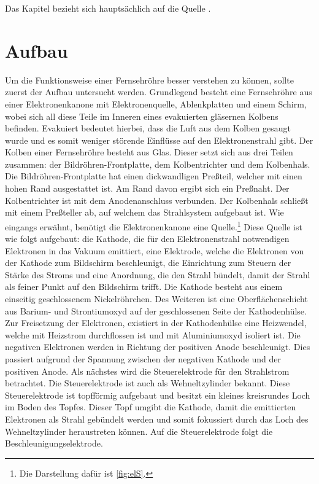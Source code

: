 Das Kapitel bezieht sich hauptsächlich auf die Quelle \cite{Fernsehroehre}.
\section{Aufbau}
\label{sec:aufbau}
Um die Funktionsweise einer Fernsehröhre besser verstehen zu können, sollte zuerst der Aufbau untersucht werden.
Grundlegend besteht eine Fernsehröhre aus einer Elektronenkanone mit Elektronenquelle, Ablenkplatten und einem Schirm, wobei sich all diese Teile im Inneren eines evakuierten gläsernen Kolbens befinden.
Evakuiert bedeutet hierbei, dass die Luft aus dem Kolben gesaugt wurde und es somit weniger störende Einflüsse auf den Elektronenstrahl gibt.
Der Kolben einer Fernsehröhre besteht aus Glas.
Dieser setzt sich aus drei Teilen zusammen: der Bildröhren-Frontplatte, dem Kolbentrichter und dem Kolbenhals.
Die Bildröhren-Frontplatte hat einen dickwandligen Preßteil, welcher mit einen hohen Rand ausgestattet ist.
Am Rand davon ergibt sich ein Preßnaht.
Der Kolbentrichter ist mit dem Anodenanschluss verbunden.
Der Kolbenhals schließt mit einem Preßteller ab, auf welchem das Strahlsystem aufgebaut ist.
Wie eingangs erwähnt, benötigt die Elektronenkanone eine Quelle.\footnote{Die Darstellung dafür ist \ref{fig:elS}.}
Diese Quelle ist wie folgt aufgebaut: die Kathode, die für den Elektronenstrahl notwendigen Elektronen in das Vakuum emittiert, eine Elektrode, welche die Elektronen von der Kathode zum Bildschirm beschleunigt, die Einrichtung zum Steuern der Stärke des Stroms und eine Anordnung, die den Strahl bündelt, damit der Strahl als feiner Punkt auf den Bildschirm trifft. 
Die Kathode besteht aus einem einseitig geschlossenem Nickelröhrchen.
Des Weiteren ist eine Oberflächenschicht aus Barium- und Strontiumoxyd auf der geschlossenen Seite der Kathodenhülse.
Zur Freisetzung der Elektronen, existiert in der Kathodenhülse eine Heizwendel, welche mit Heizstrom durchflossen ist und mit Aluminiumoxyd isoliert ist.
Die negativen Elektronen werden in Richtung der positiven Anode beschleunigt.
Dies passiert aufgrund der Spannung zwischen der negativen Kathode und der positiven Anode.
Als nächstes wird die Steuerelektrode für den Strahlstrom betrachtet.
Die Steuerelektrode ist auch als Wehneltzylinder bekannt.
Diese Steuerelektrode ist topfförmig aufgebaut und besitzt ein kleines kreisrundes Loch im Boden des Topfes.
Dieser Topf umgibt die Kathode, damit die emittierten Elektronen als Strahl gebündelt werden und somit fokussiert durch das Loch des Wehneltzylinder heraustreten können.
Auf die Steuerelektrode folgt die Beschleunigungselektrode.

